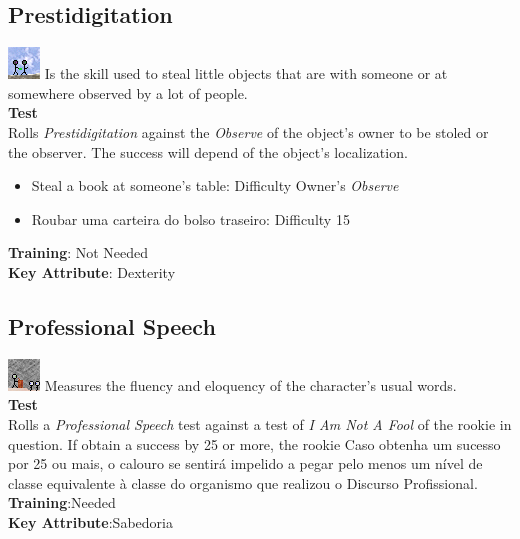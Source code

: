 \documentclass[ letterpaper,12pt]{article}
\begin{document}
\subsection{Prestidigitation}
\includegraphics{../data/skills/Img/prestidig.png}
Is the  skill used to steal little objects that are with someone or at somewhere observed by a lot of people.\\
{\bf Test}\\
Rolls {\it Prestidigitation} against the {\it Observe} of the object's owner to be stoled or the observer. The success will depend of the object's localization.\\
\begin{itemize}
\item{Steal a book at someone's table: Difficulty Owner's {\it Observe}}
\item{Roubar uma carteira do bolso traseiro: Difficulty 15}
\end{itemize}
{\bf Training}: Not Needed\\
{\bf Key Attribute}: Dexterity\\

\subsection{Professional Speech}
\includegraphics{../data/skills/Img/discursoprof.png}
Measures the fluency and eloquency of the character's usual words.\\
{\bf Test}\\
Rolls a {\it Professional Speech} test against a test of {\it I Am Not A Fool} of the rookie in question. If obtain a success by 25 or more, the rookie   Caso obtenha um sucesso por 25 ou mais, o calouro se sentirá impelido a pegar pelo menos um nível de classe equivalente à classe do organismo que realizou o Discurso Profissional.\\
{\bf Training}:Needed\\
{\bf Key Attribute}:Sabedoria\\
\end{document}
